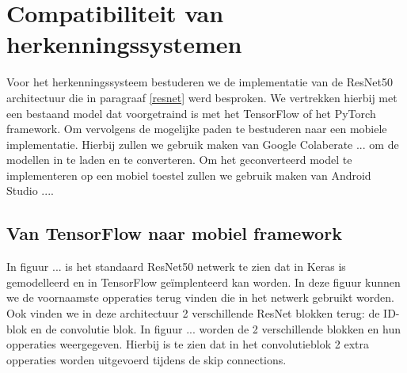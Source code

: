 \chapter{Compatibiliteit van herkenningssystemen}
Voor het herkenningssysteem bestuderen we de implementatie van de ResNet50 architectuur die in paragraaf \ref{resnet} werd besproken.
We vertrekken hierbij met een bestaand model dat voorgetraind is met het TensorFlow of het PyTorch framework.
Om vervolgens de mogelijke paden te bestuderen naar een mobiele implementatie.
Hierbij zullen we gebruik maken van Google Colaberate ... om de modellen in te laden en te converteren.
Om het geconverteerd model te implementeren op een mobiel toestel zullen we gebruik maken van Android Studio ....



\section{Van TensorFlow naar mobiel framework}
In figuur ... is het standaard ResNet50 netwerk te zien dat in Keras is gemodelleerd en in TensorFlow ge\"implenteerd kan worden.
In deze figuur kunnen we de voornaamste opperaties terug vinden die in het netwerk gebruikt worden.
Ook vinden we in deze architectuur 2 verschillende ResNet blokken terug: de ID-blok en de convolutie blok.
In figuur ... worden de 2 verschillende blokken en hun opperaties weergegeven.
Hierbij is te zien dat in het convolutieblok 2 extra opperaties worden uitgevoerd tijdens de skip connections.


